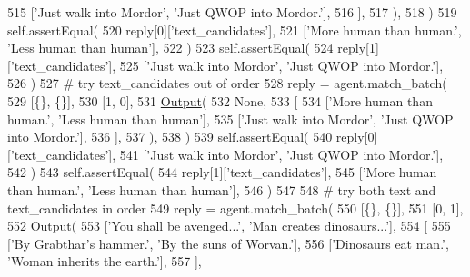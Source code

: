 \begin{DoxyCode}
515                     [\textcolor{stringliteral}{'Just walk into Mordor'}, \textcolor{stringliteral}{'Just QWOP into Mordor.'}],
516                 ],
517             ),
518         )
519         self.assertEqual(
520             reply[0][\textcolor{stringliteral}{'text\_candidates'}],
521             [\textcolor{stringliteral}{'More human than human.'}, \textcolor{stringliteral}{'Less human than human'}],
522         )
523         self.assertEqual(
524             reply[1][\textcolor{stringliteral}{'text\_candidates'}],
525             [\textcolor{stringliteral}{'Just walk into Mordor'}, \textcolor{stringliteral}{'Just QWOP into Mordor.'}],
526         )
527         \textcolor{comment}{# try text\_candidates out of order}
528         reply = agent.match\_batch(
529             [\{\}, \{\}],
530             [1, 0],
531             \hyperlink{namespaceparlai_1_1agents_1_1legacy__agents_1_1seq2seq_1_1torch__agent__v1_a2689006ea97d09413fb242f984bd8016}{Output}(
532                 \textcolor{keywordtype}{None},
533                 [
534                     [\textcolor{stringliteral}{'More human than human.'}, \textcolor{stringliteral}{'Less human than human'}],
535                     [\textcolor{stringliteral}{'Just walk into Mordor'}, \textcolor{stringliteral}{'Just QWOP into Mordor.'}],
536                 ],
537             ),
538         )
539         self.assertEqual(
540             reply[0][\textcolor{stringliteral}{'text\_candidates'}],
541             [\textcolor{stringliteral}{'Just walk into Mordor'}, \textcolor{stringliteral}{'Just QWOP into Mordor.'}],
542         )
543         self.assertEqual(
544             reply[1][\textcolor{stringliteral}{'text\_candidates'}],
545             [\textcolor{stringliteral}{'More human than human.'}, \textcolor{stringliteral}{'Less human than human'}],
546         )
547 
548         \textcolor{comment}{# try both text and text\_candidates in order}
549         reply = agent.match\_batch(
550             [\{\}, \{\}],
551             [0, 1],
552             \hyperlink{namespaceparlai_1_1agents_1_1legacy__agents_1_1seq2seq_1_1torch__agent__v1_a2689006ea97d09413fb242f984bd8016}{Output}(
553                 [\textcolor{stringliteral}{'You shall be avenged...'}, \textcolor{stringliteral}{'Man creates dinosaurs...'}],
554                 [
555                     [\textcolor{stringliteral}{'By Grabthar’s hammer.'}, \textcolor{stringliteral}{'By the suns of Worvan.'}],
556                     [\textcolor{stringliteral}{'Dinosaurs eat man.'}, \textcolor{stringliteral}{'Woman inherits the earth.'}],
557                 ],

\end{DoxyCode}
